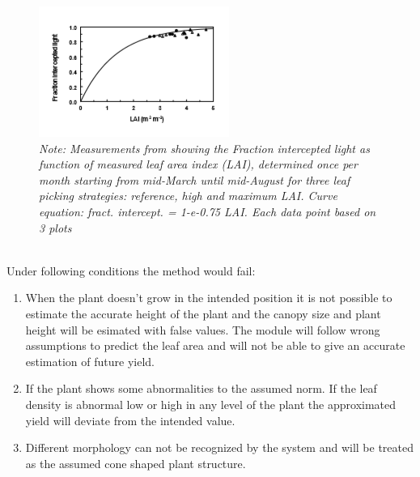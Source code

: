 \begin{figure}[h]
    \centering
    \includegraphics[scale=1.2]{LAI.PNG}
    \caption{\textit{Note: Measurements from \cite{heuvelink2004effect} showing the Fraction intercepted light as function of measured leaf area index (LAI), determined once per month starting from mid-March until mid-August for three leaf picking strategies: reference, high and maximum LAI.  Curve equation: fract. intercept. = 1-e-0.75 LAI.  Each data point based on 3 plots}}
    \label{fig:LaiCurve}
\end{figure}\\

Under following conditions the method would fail:

\begin{enumerate}
    \item When the plant doesn't grow in the intended position it is not possible to estimate the accurate height of the plant and the canopy size and plant height will be esimated with false values. The module will follow wrong assumptions to predict the leaf area and will not be able to give an accurate estimation of future yield.

    \item If the plant shows some abnormalities to the assumed norm. If the leaf density is abnormal low or high in any level of the plant the approximated yield will deviate from the intended value.

    \item Different morphology can not be recognized by the system and will be treated as the assumed cone shaped plant structure.
\end{enumerate}
